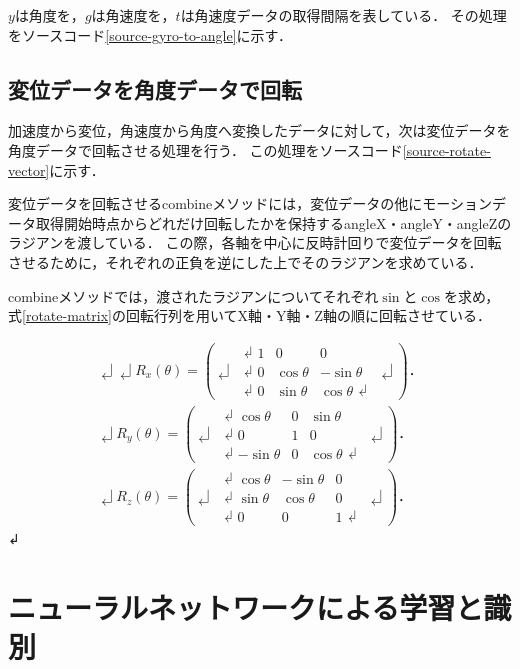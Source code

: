$y$は角度を，$g$は角速度を，$t$は角速度データの取得間隔を表している．
その処理をソースコード\ref{source-gyro-to-angle}に示す．



\subsection{変位データを角度データで回転}
加速度から変位，角速度から角度へ変換したデータに対して，次は変位データを角度データで回転させる処理を行う．
この処理をソースコード\ref{source-rotate-vector}に示す．



変位データを回転させるcombineメソッドには，変位データの他にモーションデータ取得開始時点からどれだけ回転したかを保持するangleX・angleY・angleZのラジアンを渡している．
この際，各軸を中心に反時計回りで変位データを回転させるために，それぞれの正負を逆にした上でそのラジアンを求めている．

combineメソッドでは，渡されたラジアンについてそれぞれ$\sin$と$\cos$を求め，式\ref{rotate-matrix}の回転行列を用いてX軸・Y軸・Z軸の順に回転させている．

\begin{eqnarray}↲
\label{rotate-matrix}↲
R_x(\theta) = \left(↲
    \begin{array}{ccc}↲
        1 & 0 & 0 \\↲
        0 & \cos\theta & -\sin\theta \\↲
        0 & \sin\theta & \cos\theta↲
    \end{array}↲
\right)． \nonumber \\↲
R_y(\theta) = \left(↲
    \begin{array}{ccc}↲
        \cos\theta & 0 & \sin\theta \\↲
        0 & 1 & 0 \\↲
        -\sin\theta & 0 & \cos\theta↲
    \end{array}↲
\right)． \nonumber \\↲
R_z(\theta) = \left(↲
    \begin{array}{ccc}↲
        \cos\theta & -\sin\theta & 0 \\↲
        \sin\theta & \cos\theta & 0 \\↲
        0 & 0 & 1↲
    \end{array}↲
\right)．
\end{eqnarray}↲

\section{ニューラルネットワークによる学習と識別}
